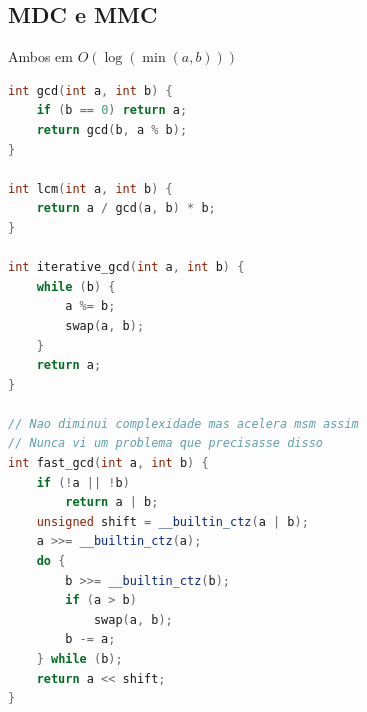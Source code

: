 \subsection{MDC e MMC}

Ambos em $O(\log(\min(a, b)))$

\begin{lstlisting}[language=C++, breaklines=true]
int gcd(int a, int b) {
    if (b == 0) return a;
    return gcd(b, a % b);
}

int lcm(int a, int b) {
    return a / gcd(a, b) * b;
}

int iterative_gcd(int a, int b) {
    while (b) {
        a %= b;
        swap(a, b);
    }
    return a;
}

// Nao diminui complexidade mas acelera msm assim
// Nunca vi um problema que precisasse disso
int fast_gcd(int a, int b) {
    if (!a || !b)
        return a | b;
    unsigned shift = __builtin_ctz(a | b);
    a >>= __builtin_ctz(a);
    do {
        b >>= __builtin_ctz(b);
        if (a > b)
            swap(a, b);
        b -= a;
    } while (b);
    return a << shift;
}
\end{lstlisting}